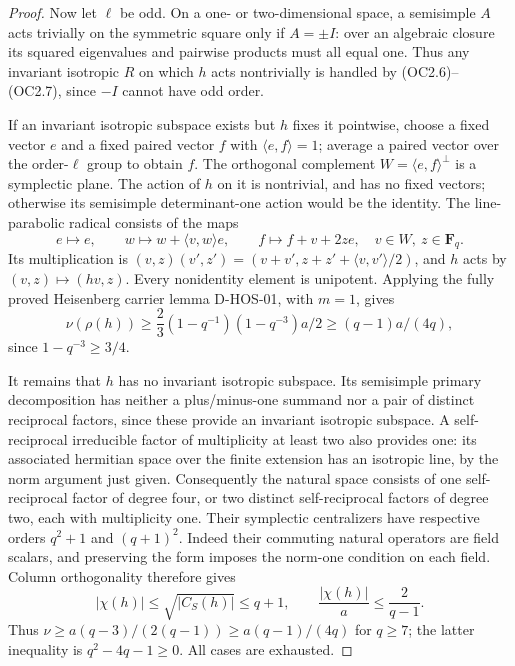 \begin{proof}
Now let $\ell$ be odd. On a one- or two-dimensional space, a
semisimple $A$ acts trivially on the symmetric square only if
$A=\pm I$: over an algebraic closure its squared eigenvalues
and pairwise products must all equal one. Thus any invariant
isotropic $R$ on which $h$ acts nontrivially is handled by
(OC2.6)--(OC2.7), since $-I$ cannot have odd order.

If an invariant isotropic subspace exists but $h$ fixes it
pointwise, choose a fixed vector $e$ and a fixed paired vector
$f$ with $\langle e,f\rangle=1$; average a paired vector over
the order-$\ell$ group to obtain $f$. The orthogonal complement
$W=\langle e,f\rangle^\perp$ is a symplectic plane. The action
of $h$ on it is nontrivial, and has no fixed vectors; otherwise
its semisimple determinant-one action would be the identity.
The line-parabolic radical consists of the maps
\[
 e\mapsto e,\qquad
 w\mapsto w+\langle v,w\rangle e,\qquad
 f\mapsto f+v+2ze,
             \quad v\in W,\ z\in\mathbf F_q.                  \tag{OC2.8}
\]
Its multiplication is $(v,z)(v',z')=(v+v',z+z'+
\langle v,v'\rangle/2)$, and $h$ acts by $(v,z)\mapsto(hv,z)$.
Every nonidentity element is unipotent. Applying the fully proved
Heisenberg carrier lemma D-HOS-01, with $m=1$, gives
\[
 \nu(\rho(h))\ge\frac23(1-q^{-1})(1-q^{-3})a/2
                       \ge(q-1)a/(4q),                        \tag{OC2.9}
\]
since $1-q^{-3}\ge3/4$.

It remains that $h$ has no invariant isotropic subspace. Its
semisimple primary decomposition has neither a plus/minus-one
summand nor a pair of distinct reciprocal factors, since these
provide an invariant isotropic subspace. A self-reciprocal
irreducible factor of multiplicity at least two also provides
one: its associated hermitian space over the finite extension
has an isotropic line, by the norm argument just given.
Consequently the natural space consists of one self-reciprocal
factor of degree four, or two distinct self-reciprocal factors
of degree two, each with multiplicity one. Their symplectic
centralizers have respective orders $q^2+1$ and $(q+1)^2$.
Indeed their commuting natural operators are field scalars,
and preserving the form imposes the norm-one condition on
each field. Column orthogonality therefore gives
\[
 |\chi(h)|\le\sqrt{|C_S(h)|}\le q+1,
 \qquad \frac{|\chi(h)|}{a}\le\frac2{q-1}.
                                                               \tag{OC2.10}
\]
Thus $\nu\ge a(q-3)/(2(q-1))\ge a(q-1)/(4q)$ for $q\ge7$;
the latter inequality is $q^2-4q-1\ge0$. All cases are exhausted.
\end{proof}


